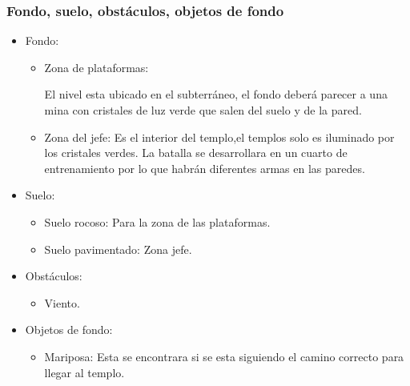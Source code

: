 \documentclass[11pt,letterpaper]{article}
\begin{document}
\begin{itemize}
\subsubsection{Fondo, suelo, obstáculos, objetos de fondo}
\begin{itemize} 
        \item Fondo:
                \begin{itemize}
                        \item Zona de plataformas:
\\
\par
El nivel esta ubicado en el subterráneo, el fondo deberá parecer a una mina con cristales de luz verde que salen del suelo y de la pared.
                        \item Zona del jefe:
Es el interior del templo,el templos solo es iluminado por los cristales verdes. La batalla se desarrollara en un cuarto de entrenamiento por lo que habrán diferentes armas en las paredes.
                \end{itemize}
        \item Suelo:
                \begin{itemize}
                        \item Suelo rocoso: Para la zona de las plataformas.
                        \item Suelo pavimentado: Zona jefe.
                \end{itemize}
	  \item Obstáculos:
                \begin{itemize}
                        \item Viento.
                \end{itemize}
        \item Objetos de fondo:
                \begin{itemize}
                        \item Mariposa: Esta se encontrara si se esta siguiendo el camino correcto para llegar al templo.
                \end{itemize}
\end{itemize}   


\end{itemize}
\end{document}
